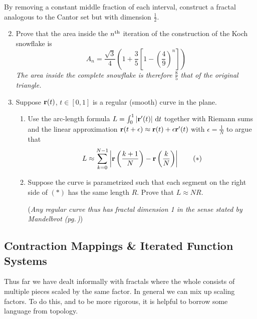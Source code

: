 \begin{exercises}
	\exstart By removing a constant middle fraction of each interval, construct a fractal analogous to the Cantor set but with dimension $\frac 12$.
	
	
	\begin{enumerate}\setcounter{enumi}{1}\itemsep2pt
		\item Prove that the area inside the $n\textsuperscript{th}$ iteration of the construction of the Koch snowflake is
		\[
			A_n=\frac{\sqrt 3}{4}\left(1+\frac 35\left[1-\left(\frac 49\right)^n\right]\right)
		\]
		\emph{The area inside the complete snowflake is therefore $\frac 85$ that of the original triangle.}
		
		
		\item\label{exs:fractaldiffcurve} Suppose ${\mathbf{r}}(t)$, $t\in [0,1]$ is a regular (smooth) curve in the plane.
		\begin{enumerate}
	  	\item Use the arc-length formula $L=\int_0^1\left| {\mathbf{r}}'(t)\right|\,{\mathrm{d} t}$ together with Riemann sums and the linear approximation ${\mathbf{r}}(t+\epsilon)\approx{\mathbf{r}}(t)+\epsilon{\mathbf{r}}'(t)$ with $\epsilon=\frac 1N$ to argue that
	  	\[
	  		L\approx\sum_{k=0}^{N-1}\left| {\mathbf{r}}\left(\frac{k+1}N\right)-{\mathbf{r}}\left(\frac{k}N\right)\right| \tag{$\ast$}
	  	\]
	  	
	
	  	\item Suppose the curve is parametrized such that each segment on the right side of $(\ast)$ has the same length $R$. Prove that $L\approx NR$.\par
	  	(\emph{Any regular curve thus has fractal dimension 1 in the sense stated by Mandelbrot (pg.\,\pageref{sec:fracdefn})})
		\end{enumerate}
		
	\end{enumerate}
\end{exercises}


\clearpage




\subsection{Contraction Mappings \& Iterated Function Systems}

Thus far we have dealt informally with fractals where the whole consists of multiple pieces scaled by the same factor. In general we can mix up scaling factors. To do this, and to be more rigorous, it is helpful to borrow some language from topology.

